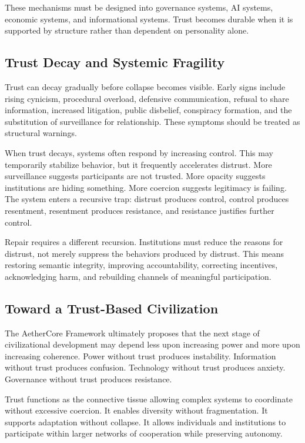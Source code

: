 \documentclass[12pt]{article}
\begin{document}
These mechanisms must be designed into governance systems, AI systems, economic systems, and informational systems. Trust becomes durable when it is supported by structure rather than dependent on personality alone.

\subsection{Trust Decay and Systemic Fragility}

Trust can decay gradually before collapse becomes visible. Early signs include rising cynicism, procedural overload, defensive communication, refusal to share information, increased litigation, public disbelief, conspiracy formation, and the substitution of surveillance for relationship. These symptoms should be treated as structural warnings.

When trust decays, systems often respond by increasing control. This may temporarily stabilize behavior, but it frequently accelerates distrust. More surveillance suggests participants are not trusted. More opacity suggests institutions are hiding something. More coercion suggests legitimacy is failing. The system enters a recursive trap: distrust produces control, control produces resentment, resentment produces resistance, and resistance justifies further control.

Repair requires a different recursion. Institutions must reduce the reasons for distrust, not merely suppress the behaviors produced by distrust. This means restoring semantic integrity, improving accountability, correcting incentives, acknowledging harm, and rebuilding channels of meaningful participation.

\subsection{Toward a Trust-Based Civilization}

The AetherCore Framework ultimately proposes that the next stage of civilizational development may depend less upon increasing power and more upon increasing coherence. Power without trust produces instability. Information without trust produces confusion. Technology without trust produces anxiety. Governance without trust produces resistance.

Trust functions as the connective tissue allowing complex systems to coordinate without excessive coercion. It enables diversity without fragmentation. It supports adaptation without collapse. It allows individuals and institutions to participate within larger networks of cooperation while preserving autonomy.
\end{document}
